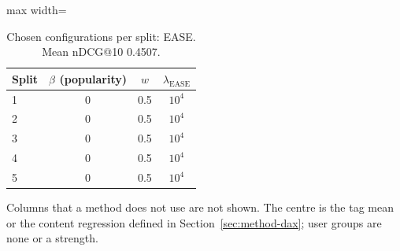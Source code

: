 \begin{table}[tbp]
\centering
\footnotesize
\caption{Chosen configurations per split: EASE. Mean nDCG@10 0.4507.}
\label{tab:grid04}
\begin{adjustbox}{max width=\linewidth}
\begin{tabular}{lccc}
\toprule
Split & $\beta$ (popularity) & $w$ & $\lambda_{\mathrm{EASE}}$ \\
\midrule
1 & 0 & 0.5 & $10^{4}$ \\
2 & 0 & 0.5 & $10^{4}$ \\
3 & 0 & 0.5 & $10^{4}$ \\
4 & 0 & 0.5 & $10^{4}$ \\
5 & 0 & 0.5 & $10^{4}$ \\
\bottomrule
\end{tabular}
\end{adjustbox}
\par\smallskip
\begin{minipage}{\linewidth}\raggedright\footnotesize Columns that a method does not use are not shown. The centre is the tag mean or the content regression defined in Section~\ref{sec:method-dax}; user groups are none or a strength.\end{minipage}
\end{table}
